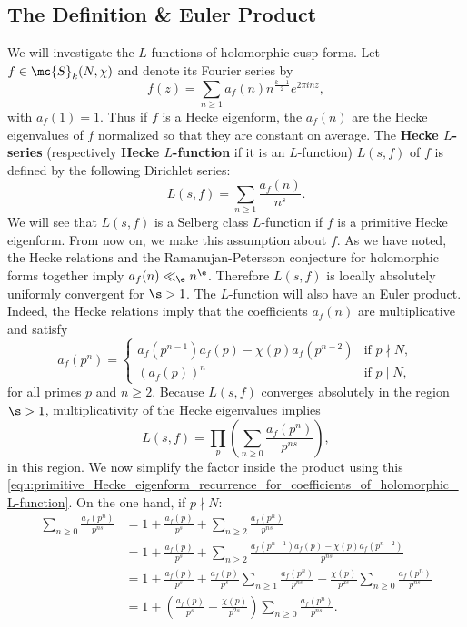     \subsection*{The Definition \& Euler Product}
      We will investigate the $L$-functions of holomorphic cusp forms. Let $f \in \mc{S}_{k}(N,\chi)$ and denote its Fourier series by
      \[
        f(z) = \sum_{n \ge 1}a_{f}(n)n^{\frac{k-1}{2}}e^{2\pi inz},
      \]
      with $a_{f}(1) = 1$. Thus if $f$ is a Hecke eigenform, the $a_{f}(n)$ are the Hecke eigenvalues of $f$ normalized so that they are constant on average. The \textbf{Hecke $L$-series} (respectively \textbf{Hecke $L$-function} if it is an $L$-function) $L(s,f)$ of $f$ is defined by the following Dirichlet series:
      \[
        L(s,f) = \sum_{n \ge 1}\frac{a_{f}(n)}{n^{s}}.
      \]
      We will see that $L(s,f)$ is a Selberg class $L$-function if $f$ is a primitive Hecke eigenform. From now on, we make this assumption about $f$. As we have noted, the Hecke relations and the Ramanujan-Petersson conjecture for holomorphic forms together imply $a_{f}(n) \ll_{\e} n^{\e}$. Therefore $L(s,f)$ is locally absolutely uniformly convergent for $\s > 1$. The $L$-function will also have an Euler product. Indeed, the Hecke relations imply that the coefficients $a_{f}(n)$ are multiplicative and satisfy
      \begin{equation}\label{equ:primitive_Hecke_eigenform_recurrence_for_coefficients_of_holomorphic_L-function}
        a_{f}(p^{n}) = \begin{cases} a_{f}(p^{n-1})a_{f}(p)-\chi(p)a_{f}(p^{n-2}) & \text{if $p \nmid N$}, \\ (a_{f}(p))^{n} & \text{if $p \mid N$}, \end{cases}
      \end{equation}
      for all primes $p$ and $n \ge 2$. Because $L(s,f)$ converges absolutely in the region $\s > 1$, multiplicativity of the Hecke eigenvalues implies
      \[
        L(s,f) = \prod_{p}\left(\sum_{n \ge 0}\frac{a_{f}(p^{n})}{p^{ns}}\right),
      \]
      in this region. We now simplify the factor inside the product using this \cref{equ:primitive_Hecke_eigenform_recurrence_for_coefficients_of_holomorphic_L-function}. On the one hand, if $p \nmid N$:
      \begin{align*}
        \sum_{n \ge 0}\frac{a_{f}(p^{n})}{p^{ns}} &= 1+\frac{a_{f}(p)}{p^{s}}+\sum_{n \ge 2}\frac{a_{f}(p^{n})}{p^{ns}} \\
        &= 1+\frac{a_{f}(p)}{p^{s}}+\sum_{n \ge 2}\frac{a_{f}(p^{n-1})a_{f}(p)-\chi(p)a_{f}(p^{n-2})}{p^{ns}} \\
        &= 1+\frac{a_{f}(p)}{p^{s}}+\frac{a_{f}(p)}{p^{s}}\sum_{n \ge 1}\frac{a_{f}(p^{n})}{p^{ns}}-\frac{\chi(p)}{p^{2s}}\sum_{n \ge 0}\frac{a_{f}(p^{n})}{p^{ns}} \\
        &= 1+\left(\frac{a_{f}(p)}{p^{s}}-\frac{\chi(p)}{p^{2s}}\right)\sum_{n \ge 0}\frac{a_{f}(p^{n})}{p^{ns}}.
      \end{align*}
